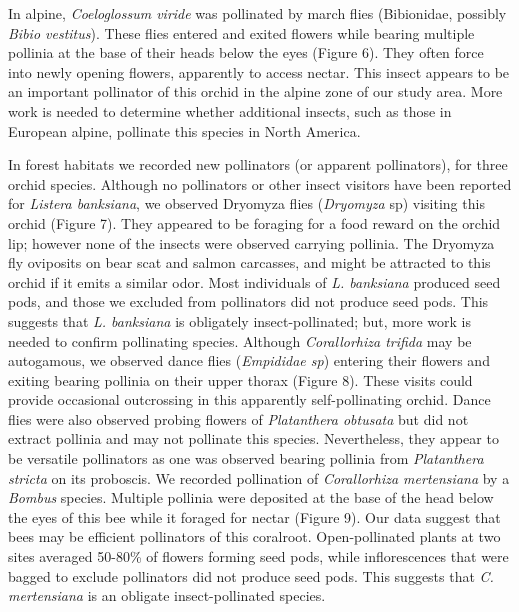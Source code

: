 \begin{multicols}{2}
In alpine, \emph{Coeloglossum viride} was pollinated by march flies
(Bibionidae, possibly \emph{Bibio vestitus}). These flies entered and
exited flowers while bearing multiple pollinia at the base of their
heads below the eyes (Figure 6). They often force into newly opening
flowers, apparently to access nectar. This insect appears to be an
important pollinator of this orchid in the alpine zone of our study
area. More work is needed to determine whether additional insects, such
as those in European alpine, pollinate this species in North America.

In forest habitats we recorded new pollinators (or apparent
pollinators), for three orchid species. Although no pollinators or other
insect visitors have been reported for \emph{Listera banksiana}, we
observed Dryomyza flies (\emph{Dryomyza} sp) visiting this orchid
(Figure 7). They appeared to be foraging for a food reward on the orchid
lip; however none of the insects were observed carrying pollinia. The
Dryomyza fly oviposits on bear scat and salmon carcasses, and might be
attracted to this orchid if it emits a similar odor. Most individuals of
\emph{L. banksiana} produced seed pods, and those we excluded from
pollinators did not produce seed pods. This suggests that \emph{L.
banksiana} is obligately insect-pollinated; but, more work is needed to
confirm pollinating species. Although \emph{Corallorhiza trifida} may be
autogamous, we observed dance flies (\emph{Empididae sp}) entering their
flowers and exiting bearing pollinia on their upper thorax (Figure 8).
These visits could provide occasional outcrossing in this apparently
self-pollinating orchid. Dance flies were also observed probing flowers
of \emph{Platanthera obtusata} but did not extract pollinia and may not
pollinate this species. Nevertheless, they appear to be versatile
pollinators as one was observed bearing pollinia from \emph{Platanthera
stricta} on its proboscis. We recorded pollination of \emph{Corallorhiza
mertensiana} by a \emph{Bombus} species. Multiple pollinia were
deposited at the base of the head below the eyes of this bee while it
foraged for nectar (Figure 9). Our data suggest that bees may be
efficient pollinators of this coralroot. Open-pollinated plants at two
sites averaged 50-80\% of flowers forming seed pods, while
inflorescences that were bagged to exclude pollinators did not produce
seed pods. This suggests that \emph{C. mertensiana} is an obligate
insect-pollinated species.


\end{multicols}

